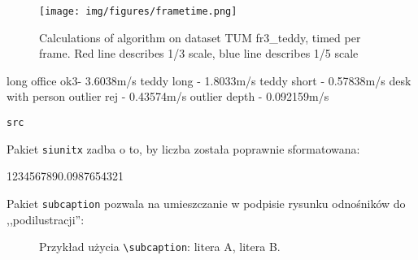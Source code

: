 \begin{figure}[ht]
	\centering\texttt{[image: img/figures/frametime.png]}
	\caption{ Calculations of algorithm on dataset TUM fr3\_teddy, timed per frame. Red line describes 1/3 scale, blue line describes 1/5 scale }
	\label{fig:timing}
\end{figure}


long office ok3- 3.6038m/s
teddy long - 1.8033m/s
teddy short - 0.57838m/s
desk with person outlier rej - 0.43574m/s
				 outlier depth - 0.092159m/s







\begin{lstlisting}
src
\end{lstlisting}

Pakiet \texttt{siunitx} zadba o to, by liczba została poprawnie sformatowana: \\
\begin{center}
	\num{1234567890.0987654321}
\end{center}


Pakiet \texttt{subcaption} pozwala na umieszczanie w podpisie rysunku odnośników do ,,podilustracji'': \\

\begin{figure}[h]
	\centering
	\begin{subfigure}{0.35\textwidth}
		\centering
		\subcaption{\label{subfigure_a}}
	\end{subfigure}
	\begin{subfigure}{0.35\textwidth}
		\centering
		\subcaption{\label{subfigure_b}}
	\end{subfigure}
	
	\caption{\label{fig:subcaption_example}Przykład użycia \texttt{\textbackslash subcaption}: \protect{} litera A, \protect{} litera B.}
\end{figure}

